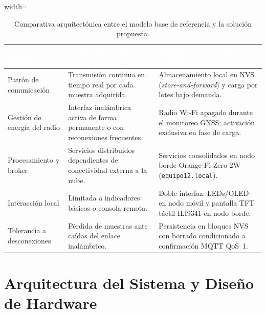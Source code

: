 \documentclass[12pt, letterpaper]{article}
\begin{document}
\begin{table}[H]
    \centering
    \small
    \renewcommand{\arraystretch}{1.5}
    \caption{Comparativa arquitectónica entre el modelo base de referencia y la solución propuesta.}
    \label{tab:justificacion_arquitectura}
    \begin{adjustbox}{width=\textwidth}
    \begin{tabular}{|m{4cm}|m{6cm}|m{6cm}|}
        \hline
        \rowcolor{MidnightBlue!80}
        \textcolor{white}{\textbf{Dimensión}} & \textcolor{white}{\textbf{Arquitectura Base (Figura 1)}} & \textcolor{white}{\textbf{Arquitectura Propuesta (Equipo 12)}} \\
        \hline
        Patrón de comunicación & Transmisión continua en tiempo real por cada muestra adquirida. & Almacenamiento local en NVS (\textit{store-and-forward}) y carga por lotes bajo demanda. \\
        \hline
        Gestión de energía del radio & Interfaz inalámbrica activa de forma permanente o con reconexiones frecuentes. & Radio Wi-Fi apagado durante el monitoreo GNSS; activación exclusiva en fase de carga. \\
        \hline
        Procesamiento y broker & Servicios distribuidos dependientes de conectividad externa a la nube. & Servicios consolidados en nodo borde Orange Pi Zero 2W (\texttt{equipo12.local}). \\
        \hline
        Interacción local & Limitada a indicadores básicos o consola remota. & Doble interfaz: LEDs/OLED en nodo móvil y pantalla TFT táctil ILI9341 en nodo borde. \\
        \hline
        Tolerancia a desconexiones & Pérdida de muestras ante caídas del enlace inalámbrico. & Persistencia en bloques NVS con borrado condicionado a confirmación MQTT QoS~1. \\
        \hline
    \end{tabular}
    \end{adjustbox}
\end{table}

\vspace*{0.8cm}
\section*{\centering \fontsize{16}{17}\sffamily\selectfont Arquitectura del Sistema y Diseño de Hardware}
\end{document}
